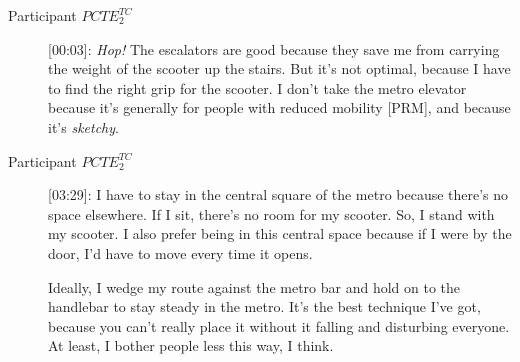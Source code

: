 \begin{description}
    \item[Participant \(PCTE^{TC}_{2}\)] [00:03]: \textsl{Hop!} The escalators are good because they save me from carrying the weight of the scooter up the stairs. But it’s not optimal, because I have to find the right grip for the scooter. I don’t take the metro elevator because it’s generally for people with reduced mobility [PRM], and because it’s \textsl{sketchy}.
    \item[Participant \(PCTE^{TC}_{2}\)] [03:29]: I have to stay in the central square of the metro because there’s no space elsewhere. If I sit, there’s no room for my scooter. So, I stand with my scooter. I also prefer being in this central space because if I were by the door, I’d have to move every time it opens.%
    
    Ideally, I wedge my route against the metro bar and hold on to the handlebar to stay steady in the metro. It’s the best technique I’ve got, because you can’t really place it without it falling and disturbing everyone. At least, I bother people less this way, I think.%


\end{description}
